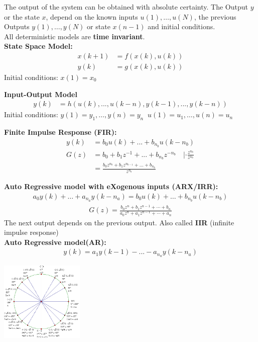 \begin{tcolorbox}[colback=green!5!white,colframe=green!75!black,title=\textbf{Deterministic Model}]
  The output of the system can be obtained with absolute certainty. The Output $y$ or the state $x$, depend on the known inputs $u(1), \dots, u(N)$, the previous Outputs $y(1), \dots, y(N)$ or state $x(n-1)$ and initial conditions. \\
  All deterministic models are \textbf{time invariant}.\\
\textbf{State Space Model: }
\begin{align*}
	 x(k+1) &= f(x(k), u(k)) \\
	y(k) &= g(x(k), u(k)) 
\end{align*}
Initial conditions: $x(1) = x_0$

\textbf{Input-Output Model}
\begin{align*}
y(k) &= h(u(k), ..., u(k-n), y(k-1), ..., y(k-n))
\end{align*}
Initial conditions: $y(1) = y_1,\dots,y(n) = y_n  \;\; u(1)= u_1,\dots,u(n) = u_n$

\textbf{Finite Impulse Response (FIR): } 
\begin{align*}
	y(k) &= b_0 u(k) + ... + b_{n_b} u(k-n_b) \\
	G(z) &= b_0 + b_1z^{-1} + ... + b_{n_b}z^{-n_b} \quad | \cdot \frac{z^{n_b}}{z^{n_b}} \\
	&= \frac{b_0 z^{n_b} + b_1 z^{ n_{b-1} } + ... + b_{n_b} }{z^{n_b}}
\end{align*}

\textbf{Auto Regressive model with eXogenous inputs (ARX/IRR):}
\begin{align*}
	a_0y(k)+\dots+a_{n_a}y(k-n_a) = b_0u(k) + \dots+b_{n_b}u(k-n_b)
\end{align*}
\begin{align*}
G(z) = \frac{b_0z^n + b_1z^{n-1} + \cdots + b_n}{a_0z^n + a_1z^{n-1} + \cdots + a_n}
\end{align*}
The next output depends on the previous output. Also called \textbf{IIR} (infinite impulse response)\\

\textbf{Auto Regressive model(AR):}
\begin{align*}
	y(k)= a_1y(k-1)-...-a_{n_a}y(k-n_a)
\end{align*}
\end{tcolorbox}
\includegraphics[width=0.3\textwidth]{unit_circle}
